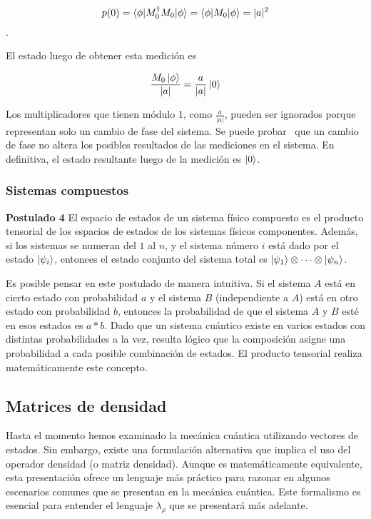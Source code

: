 \[p(0) = \braket{\phi|M_0^\dagger M_0|\phi} = \braket{\phi|M_0|\phi} = |a|^2\].

El estado luego de obtener esta medición es

\[\frac{M_0\ket{\phi}}{|a|} = \frac{a}{|a|}\ket{0}\]

Los multiplicadores que tienen módulo $1$, como $\frac{a}{|a|}$, pueden ser ignorados porque representan solo un cambio de fase del sistema. Se puede probar~\cite{purification} que un cambio de fase no altera los posibles resultados de las mediciones en el sistema. En definitiva, el estado resultante luego de la medición es $\ket{0}$.



\subsubsection{Sistemas compuestos}

\begin{displayquote}
    \textbf{Postulado 4}
    El espacio de estados de un sistema físico compuesto es el producto tensorial de los espacios de estados de los sistemas físicos componentes. Además, si los sistemas se numeran del $1$ al $n$, y el sistema número $i$ está dado por el estado $\ket{\psi_i}$, entonces el estado conjunto del sistema total es $\ket{\psi_1}\otimes \dots \otimes \ket{\psi_n}$.
\end{displayquote}

Es posible pensar en este postulado de manera intuitiva. Si el sistema $A$ está en cierto estado con probabilidad $a$ y el sistema $B$ (independiente a $A$) está en otro estado con probabilidad $b$, entonces la probabilidad de que el sistema $A$ y $B$ esté en esos estados es $a*b$. Dado que un sistema cuántico existe en varios estados con distintas probabilidades a la vez, resulta lógico que la composición asigne una probabilidad a cada posible combinación de estados. El producto tensorial realiza matemáticamente este concepto.

\subsection{Matrices de densidad}
Hasta el momento hemos examinado la mecánica cuántica utilizando vectores de estados. Sin embargo, existe una formulación alternativa que implica el uso del operador densidad (o matriz densidad). Aunque es matemáticamente equivalente, esta presentación ofrece un lenguaje más práctico para razonar en algunos escenarios comunes que se presentan en la mecánica cuántica. Este formalismo es esencial para entender el lenguaje $\lambda_\rho$ que se presentará más adelante.


